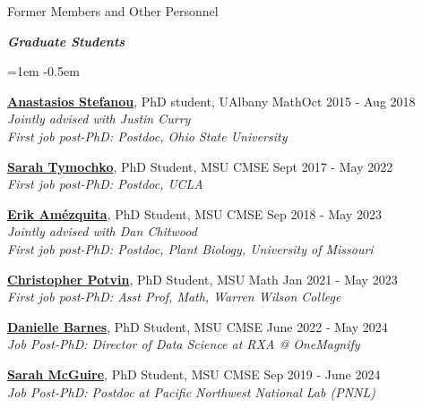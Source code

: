 \documentclass{resume} %
\begin{document}
\begin{rSection}{Former Members and Other Personnel}


\textbf{\textit{Graduate Students}}
\begin{list}{}{\leftmargin=1em}
   \itemsep -0.5em %


   \item \textbf{\href{https://sites.google.com/view/anastasiostefanou/home}{Anastasios Stefanou}}, PhD student, UAlbany Math\hfill Oct 2015 - Aug 2018
\\
   \phantom{XXX} \textit{Jointly advised with Justin Curry}
\\
   \phantom{XXX} \textit{First job post-PhD: Postdoc, Ohio State University}


   \item \textbf{\href{https://www.sarahtymochko.com/}{Sarah Tymochko}}, PhD Student, MSU CMSE \hfill Sept 2017 - May 2022
\\
   \phantom{XXX} \textit{First job post-PhD: Postdoc, UCLA}

   \item \textbf{\href{https://ejamezquita.github.io/}{Erik Am\'ezquita}}, PhD Student, MSU CMSE \hfill Sep 2018 - May 2023
\\
   \phantom{XXX} \textit{Jointly advised with Dan Chitwood}\\
   \phantom{XXX} \textit{First job post-PhD: Postdoc, Plant Biology, University of Missouri}

   \item \textbf{\href{https://sites.google.com/view/christopherpotvin/home}{Christopher Potvin}}, PhD Student, MSU Math \hfill Jan 2021 - May 2023\\
   \phantom{XXX} \textit{First job post-PhD: Asst Prof, Math, Warren Wilson College}

   \item \textbf{\href{https://www.linkedin.com/in/danielle-k-barnes/}{Danielle Barnes}}, PhD Student, MSU CMSE \hfill June 2022 - May 2024 \\ 
   \phantom{XXX} \textit{Job Post-PhD:  Director of Data Science at RXA @ OneMagnify}

   \item \textbf{\href{https://www.sarah-mcguire.com/}{Sarah McGuire}}, PhD Student, MSU CMSE \hfill Sep 2019 - June 2024\\
   \phantom{XXX} \textit{Job Post-PhD:  Postdoc at Pacific Northwest National Lab (PNNL)}



\end{list}
\end{rSection}
\end{document}
